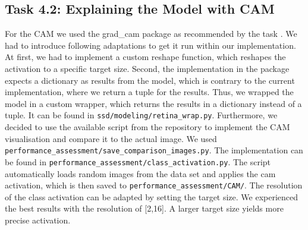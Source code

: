 \documentclass{article}
\begin{document}
\subsection*{Task 4.2: Explaining the Model with CAM}

For the CAM we used the grad\_cam package as recommended by the task \cite{gradcam}. We had to introduce following adaptations to get it run within our implementation. At first, we had to implement a custom reshape function, which reshapes the activation to a specific target size. Second, the implementation in the package expects a dictionary as results from the model, which is contrary to the current implementation, where we return a tuple for the results. Thus, we wrapped the model in a custom wrapper, which returns the results in a dictionary instead of a tuple. It can be found in \texttt{ssd/modeling/retina\_wrap.py}. Furthermore, we decided to use the available script from the repository to implement the CAM visualisation and compare it to the actual image. We used \texttt{performance\_assessment/save\_comparison\_images.py}. The implementation can be found in \texttt{performance\_assessment/class\_activation.py}. The script automatically loads random images from the data set and applies the cam activation, which is then saved to \texttt{performance\_assessment/CAM/}. The resolution of the class activation can be adapted by setting the target size. We experienced the best results with the resolution of [2,16]. A larger target size yields more precise activation.
\end{document}
